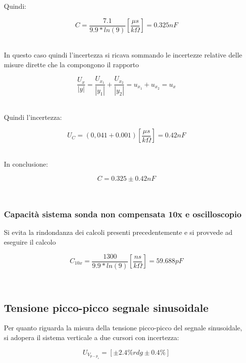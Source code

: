 \documentclass[a4paper]{article}
\begin{document}
Quindi:
\begin{Large}
	\begin{equation}
  		C= \frac{7.1}{9.9*ln(9)} [\frac{\mu s}{k\Omega}]= 0.325nF
	\end{equation}
\end{Large}\\

In questo caso quindi l'incertezza si ricava sommando le incertezze relative delle misure dirette che la compongono il rapporto 
\begin{Large}
	\begin{equation}
  		\frac{U_x}{|y|}= \frac{U_{x_1}}{|y_1|}+\frac{U_{x_2}}{|y_2|}=u_{x_1}+u_{x_2}=u_x
	\end{equation}
\end{Large}\\

Quindi l'incertezza:
\begin{Large}
	\begin{equation}
		{U_C}= (0,041+0.001 )[\frac{\mu s}{k\Omega}]= 0.42nF
	\end{equation}
\end{Large}\\

In conclusione: 
\begin{Large}
	\begin{equation}
		C=0.325\pm 0.42nF
	\end{equation}
\end{Large}\\

\subsubsection{Capacità sistema sonda non compensata 10x e oscilloscopio }
Si evita la rindondanza dei calcoli presenti precedentemente e si provvede ad eseguire il calcolo
\begin{Large}
	\begin{equation}
  		C_{10x}= \frac{1300}{9.9*ln(9)} [\frac{ns}{k\Omega}]= 59.688pF
	\end{equation}
\end{Large}\\

\subsection{Tensione picco-picco segnale sinusoidale} %
Per quanto riguarda la misura della tensione picco-picco del segnale sinusoidale, si adopera il sistema verticale a due cursori con incertezza:
\begin{Large}
	\begin{equation}
		U_{V_{p-p_{s}}}= [\pm 2.4\% rdg\pm 0.4\%]
	\end{equation}
\end{Large}\\
\end{document}
